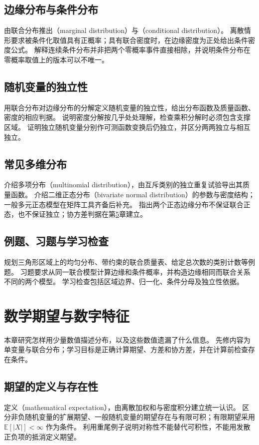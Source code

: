 \documentclass[UTF8,12pt,a4paper,fontset=fandol]{ctexbook}
\begin{document}
\section{边缘分布与条件分布}
\label{sec:ps-marginal-conditional}
由联合分布推出（marginal distribution）与（conditional distribution）。
离散情形要求被条件化取值具有正概率；具有联合密度时，在边缘密度为正处给出条件密度公式。
解释连续条件分布并非把两个零概率事件直接相除，并说明条件分布在零概率取值上的版本可以不唯一。

\section{随机变量的独立性}
\label{sec:ps-variable-independence}
用联合分布对边缘分布的分解定义随机变量的独立性，给出分布函数及质量函数、密度的相应判据。
说明密度分解按几乎处处理解，检查乘积分解时必须包含支撑区域。
证明独立随机变量分别作可测函数变换后仍独立，并区分两两独立与相互独立。

\section{常见多维分布}
\label{sec:ps-multivariate-models}
介绍多项分布（multinomial distribution），由互斥类别的独立重复试验导出其质量函数。
介绍二维正态分布（bivariate normal distribution）的参数与密度结构；一般多元正态模型在矩阵工具齐备后补充。
指出两个正态边缘分布不保证联合正态，也不保证独立；协方差判据在第\ref{chap:ps-moments}章建立。

\section{例题、习题与学习检查}
规划三角形区域上的均匀分布、带约束的联合质量表、给定总次数的类别计数等例题。
习题要求从同一联合模型计算边缘和条件概率，并构造边缘相同而联合关系不同的两个模型。
学习检查包括区域边界、归一化、条件分母及独立性依据。


\chapter{数学期望与数字特征}
\label{chap:ps-moments}

本章研究怎样用少量数值描述分布，以及这些数值遗漏了什么信息。
先修内容为单变量与联合分布；学习目标是正确计算期望、方差和协方差，并在计算前检查存在条件。

\section{期望的定义与存在性}
\label{sec:ps-expectation-definition}
定义（mathematical expectation），由离散加权和与密度积分建立统一认识。
区分非负随机变量的扩展期望、一般随机变量的期望存在与有限可积；有限期望采用 $\mathbb E[|X|]<\infty$ 作为条件。
利用重尾例子说明对称性不能替代可积性，不能用发散正负项的抵消定义期望。
\end{document}
